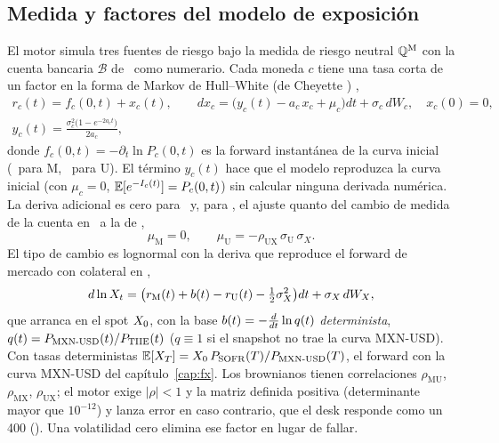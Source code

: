 \begin{sloppypar}
\subsection{Medida y factores del modelo de exposición}\label{sec:cap14-factores}

El motor simula tres fuentes de riesgo bajo la medida de riesgo neutral $\mathbb{Q}^{\mathrm M}$ con la cuenta bancaria
$\mathcal B$ de \MXN\ como numerario. Cada moneda $c$ tiene una tasa corta de un factor en la forma de Markov de
Hull--White (de Cheyette \citep{cheyette2001}) \citep{hull1990,brigo2006,ritchken1995,andersen2010},
\begin{equation}\label{eq:cap14-factor}
\begin{gathered}
  r_c(t)=f_c(0,t)+x_c(t),\qquad dx_c=\bigl(y_c(t)-a_c\,x_c+\mu_c\bigr)dt+\sigma_c\,dW_c,\quad x_c(0)=0,\\[2pt]
  y_c(t)=\frac{\sigma_c^{2}\bigl(1-e^{-2a_ct}\bigr)}{2a_c},
\end{gathered}
\end{equation}
donde $f_c(0,t)=-\partial_t\ln P_c(0,t)$ es la forward instantánea de la curva inicial (\cTIIE\ para M, \cSOFR\ para U).
El término $y_c(t)$ hace que el modelo reproduzca la curva inicial (con $\mu_c=0$, $\mathbb{E}[e^{-I_c(t)}]=P_c(0,t)$) sin
calcular ninguna derivada numérica. La deriva adicional es cero para \MXN\ y, para \USD, el ajuste quanto del cambio de medida de la
cuenta en \USD\ a la de \MXN,
\begin{equation}\label{eq:cap14-quanto}
  \mu_{\mathrm M}=0,\qquad \mu_{\mathrm U}=-\rho_{\mathrm{UX}}\,\sigma_{\mathrm U}\,\sigma_X .
\end{equation}
El tipo de cambio es lognormal con la deriva que reproduce el forward de mercado con colateral en \USD,
\begin{equation}\label{eq:cap14-fx}
  d\ln X_t=\bigl(r_{\mathrm M}(t)+b(t)-r_{\mathrm U}(t)-\tfrac12\sigma_X^{2}\bigr)dt+\sigma_X\,dW_X,
\end{equation}
que arranca en el spot $X_0$,
con la base $b(t)=-\frac{d}{dt}\ln q(t)$ \emph{determinista}, $q(t)=P_{\mathrm{MXN\text{-}USD}}(t)/P_{\mathrm{TIIE}}(t)$
($q\equiv1$ si el snapshot no trae la curva MXN-USD). Con tasas deterministas $\mathbb{E}[X_T]=X_0\,P_{\mathrm{SOFR}}(T)/P_{\mathrm{MXN\text{-}USD}}(T)$,
el forward con la curva MXN-USD del capítulo~\ref{cap:fx}. Los brownianos tienen correlaciones $\rho_{\mathrm{MU}}$,
$\rho_{\mathrm{MX}}$, $\rho_{\mathrm{UX}}$; el motor exige $|\rho|<1$ y la matriz definida positiva
(determinante mayor que $10^{-12}$) y lanza error en caso contrario, que el desk responde como un 400
(). Una volatilidad cero elimina ese factor en lugar de fallar.


\end{sloppypar}
